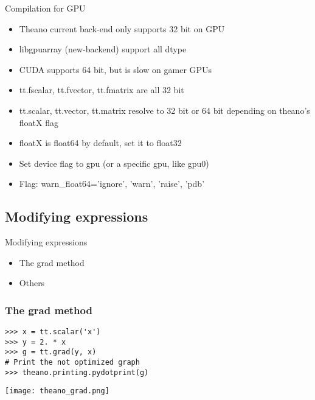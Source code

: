 \documentclass[utf8x,xcolor=pdftex,dvipsnames,table]{beamer}
\begin{document}
\begin{frame}{Compilation for GPU}
  \begin{itemize}
  \item Theano current back-end only supports 32 bit on GPU
  \item libgpuarray (new-backend) support all dtype
  \item CUDA supports 64 bit, but is slow on gamer GPUs
  \item tt.fscalar, tt.fvector, tt.fmatrix are all 32 bit
  \item tt.scalar, tt.vector, tt.matrix resolve to 32 bit or 64 bit depending on theano’s floatX flag
  \item floatX is float64 by default, set it to float32
  \item Set device flag to gpu (or a specific gpu, like gpu0)
  \item Flag: warn\_float64={'ignore', 'warn', 'raise', 'pdb'}
  \end{itemize}
\end{frame}

\subsection{Modifying expressions}
\begin{frame}{Modifying expressions}
  \begin{itemize}
  \item The grad method
  \item Others

  \end{itemize}
\end{frame}

\begin{frame}[fragile]
  \frametitle{The grad method}

\begin{lstlisting}
>>> x = tt.scalar('x')
>>> y = 2. * x
>>> g = tt.grad(y, x)
# Print the not optimized graph
>>> theano.printing.pydotprint(g)
\end{lstlisting}
\texttt{[image: theano\_grad.png]}
\end{frame}
\end{document}
